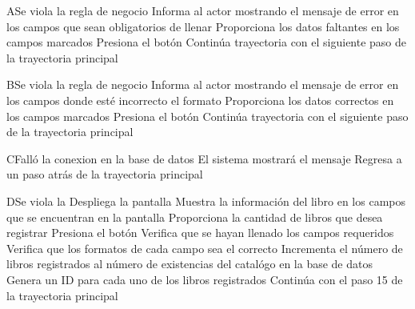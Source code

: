 
\begin{UCtrayectoriaA}{A}{Se viola la regla de negocio }	
			\UCpaso[\UCsist] Informa al actor mostrando el mensaje de error  en los campos que sean obligatorios de llenar
			\UCpaso[\UCactor] Proporciona los datos faltantes en los campos marcados 
			\UCpaso[\UCactor] Presiona el botón   
			\UCpaso[\UCsist] Continúa trayectoria con el siguiente paso de la trayectoria principal 
\end{UCtrayectoriaA}


\begin{UCtrayectoriaA}{B}{Se viola la regla de negocio }	
			\UCpaso[\UCsist] Informa al actor mostrando el mensaje de error  en los campos donde esté incorrecto el formato
			\UCpaso[\UCactor] Proporciona los datos correctos en los campos marcados 
			\UCpaso[\UCactor] Presiona el botón     
			\UCpaso[\UCsist] Continúa trayectoria con el siguiente paso de la trayectoria principal 
\end{UCtrayectoriaA}


\begin{UCtrayectoriaA}{C}{Falló la conexion en la base de datos}
			\UCpaso[\UCsist] El sistema mostrará el mensaje 
			\UCpaso[\UCsist] Regresa a un paso atrás de la trayectoria principal 
\end{UCtrayectoriaA}


\begin{UCtrayectoriaA}{D}{Se viola la }
			\UCpaso[\UCsist] Despliega la pantalla 
			\UCpaso[\UCsist] Muestra la información del libro en los campos que se encuentran en la pantalla 
			\UCpaso[\UCactor] Proporciona la cantidad de libros que desea registrar
			\UCpaso[\UCactor] Presiona el botón  
			\UCpaso[\UCsist] Verifica que se hayan llenado los campos requeridos 
			\UCpaso[\UCsist] Verifica que los formatos de cada campo sea el correcto 
			\UCpaso[\UCsist] Incrementa el número de libros registrados al número de existencias del catalógo en la base de datos
			\UCpaso[\UCsist] Genera un ID para cada uno de los libros registrados
			\UCpaso[\UCsist] Continúa con el paso 15 de la trayectoria principal  
\end{UCtrayectoriaA}

